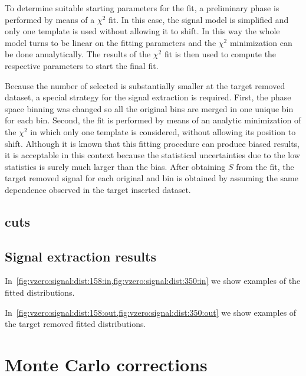 To determine suitable starting parameters for the fit,
a preliminary phase is performed by means of a $\chi^2$
fit. In this case, the signal model is simplified and
only one template is used without allowing it to shift.
In this way the whole model turns to be linear on the fitting
parameters and the $\chi^2$ minimization can be done annalytically.
The results of the $\chi^2$ fit
is then used to compute the respective parameters
to start the final fit.

Because the number of selected \vzeros is substantially smaller
at the target removed dataset, a special strategy for the signal
extraction is required. First, the phase space binning was
changed so all the original \pT bins are merged
in one unique bin for each \pp bin. Second, the \minv fit is performed
by means of an analytic minimization of the $\chi^2$
in which only one template is considered, without allowing
its position to shift. Although it is known that this fitting
procedure can produce biased results, it is acceptable in this
context because the statistical uncertainties due to the low
statistics is surely much larger than the bias.
After obtaining $S$ from the \minv fit, the target removed
signal for each original \pp and \pT bin is obtained by assuming
the same \pT dependence observed in the target inserted dataset.


\subsection{\vzero cuts}
\label{sec:hadron:vzero:signal:cuts}


\subsection{Signal extraction results}
\label{sec:hadron:vzero:results}

In~\cref{fig:vzero:signal:dist:158:in,fig:vzero:signal:dist:350:in}
we show examples of the fitted \minv distributions.

In~\cref{fig:vzero:signal:dist:158:out,fig:vzero:signal:dist:350:out}
we show examples of the target removed \minv fitted
distributions.




\section{Monte Carlo corrections}
\label{sec:hadron:correction}


